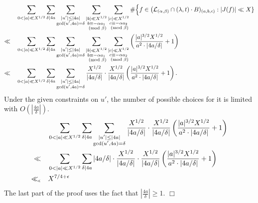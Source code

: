 \documentclass{article}
\newenvironment{proof}{\noindent {\bf Proof:}}{$\Box$ \vspace{2 ex}}
\def \gcd{{\rm gcd}}
\begin{document}
\begin{proof}
\begin{align*}
& \sum_{0 < |a| \ll X^{1/2}} \sum_{\delta \mid 4a} \sum_{\substack{|u'| \leq |4a| \\ \gcd(u', 4a) = \delta}} \sum_{\substack{|b| \ll X^{1/2} \\ b \equiv -\alpha a_1 \\ \pmod{\beta}}} \sum_{\substack{|c| \ll X^{1/2} \\ c \equiv -\alpha a_2 \\ \pmod{\beta}}} \# \Big\{ f \in \big(\mathcal{L}_{(\alpha,\beta)} \cap (\lambda,t)\cdot B)_{(a,b,c)} :  |J(f)| \ll X\} \\ \ll \quad
&
\sum_{0 < |a| \ll X^{1/2}} \sum_{\substack{\delta \mid 4a}} \sum_{\substack{|u'| \leq |4a| \\ \gcd(u', 4a) = \delta}} \sum_{\substack{|b| \ll X^{1/2} \\ b \equiv -\alpha a_1 \\ \pmod{\beta}}} \sum_{\substack{|c| \ll X^{1/2} \\ c \equiv -\alpha a_2 \\ \pmod{\beta}}}\left( \frac{|a|^{3/2} X^{1/2}}{a^2 \cdot |4a/\delta|} + 1 \right) \\ \ll  \quad
&\sum_{0 < |a| \ll X^{1/2}} \sum_{\substack{\delta \mid 4a}} \sum_{\substack{|u'| \leq |4a| \\ \gcd(u', 4a) = \delta\\
}}  \frac{X^{1/2}}{|4a/\delta|} \cdot \frac{X^{1/2}}{|4a/\delta|} \left( \frac{|a|^{3/2} X^{1/2}}{a^2 \cdot |4a/\delta|} + 1 \right).
\end{align*}
Under the given constraints on $u'$, the number of possible choices for it is limited with $O(|\frac{4a}{\delta}|)$. 
\begin{align*}
    &\sum_{0 < |a| \ll X^{1/2}} \sum_{\substack{\delta \mid 4a}} \sum_{\substack{|u'| \leq |4a| \\ \gcd(u', 4a) = \delta\\
}}  \frac{X^{1/2}}{|4a/\delta|} \cdot \frac{X^{1/2}}{|4a/\delta|} \left( \frac{|a|^{3/2} X^{1/2}}{a^2 \cdot |4a/\delta|} + 1 \right)  \\ \ll \quad
 &\sum_{0 < |a| \ll X^{1/2}} \sum_{\substack{\delta \mid 4a }}     |4a/\delta| \cdot\frac{X^{1/2}}{|4a/\delta|} \cdot \frac{X^{1/2}}{|4a/\delta|} \left( \frac{|a|^{3/2} X^{1/2}}{a^2 \cdot |4a/\delta|} + 1 \right) \\\ll_{\epsilon}\quad
 &X^{7/4+\epsilon}
\end{align*}
The last part of the proof uses the fact that $|\frac{4a}{\delta}| \geq 1$.
\end{proof}
\end{document}
